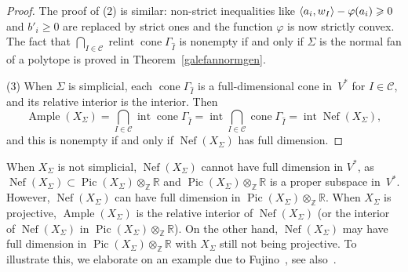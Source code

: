 \documentclass[a4paper]{amsart}
\theoremstyle{definition}
\theoremstyle{remark}
\numberwithin{equation}{section}
\def\R{\mathbb R}
\def\R{\mathbb R}
\def\Z{\mathbb Z}
\newcommand{\mb}[1]{{\textbf {\textit#1}}}
\renewcommand{\ge}{\geqslant}
\def\cone{\mathop{\mathrm{cone}}}
\def\relint{\mathop{\mathrm{relint}}}
\newcommand{\<}{\langle}
\renewcommand{\>}{\rangle}
\begin{document}
\begin{proof}
\smallskip

The proof of (2) is similar: non-strict inequalities like $\langle\mb a_i,\mb w_I\rangle-\varphi(\mb a_i)\ge0$ and $b'_i\ge0$ are replaced by strict ones and the function $\varphi$ is now strictly convex. The fact that $\bigcap_{I\in\mathcal C}
  \relint\cone\Gamma_{\widehat I}$ is nonempty if and only if $\Sigma$ is the normal fan of a polytope is proved in Theorem~\ref{galefannormgen}.
  
\smallskip

(3) When $\Sigma$ is simplicial, each $\cone\Gamma_{\widehat I}$ is a full-dimensional cone in~$V^*$ for $I\in\mathcal C$, and its relative interior is the interior. Then
\[
  \mathop\mathrm{Ample}(X_\Sigma)=\bigcap_{I\in\mathcal C}
  \mathop\mathrm{int}\cone\Gamma_{\widehat I}=\mathop\mathrm{int}  
  \bigcap_{I\in\mathcal C}\cone\Gamma_{\widehat I}=
  \mathop\mathrm{int}\mathop\mathrm{Nef}(X_\Sigma),
\]
and this is nonempty if and only if $\mathop\mathrm{Nef}(X_\Sigma)$ has full dimension.
\end{proof}

When $X_\Sigma$ is not simplicial, $\mathop\mathrm{Nef}(X_\Sigma)$ cannot have full dimension in $V^*$, as $\mathop\mathrm{Nef}(X_\Sigma)\subset\mathop\mathrm{Pic}(X_\Sigma)\otimes_\Z\R$ and $\mathop\mathrm{Pic}(X_\Sigma)\otimes_\Z\R$ is a proper subspace in~$V^*$. However, $\mathop\mathrm{Nef}(X_\Sigma)$ can have full dimension in $\mathop\mathrm{Pic}(X_\Sigma)\otimes_\Z\R$. When $X_\Sigma$ is projective, $\mathop\mathrm{Ample}(X_\Sigma)$ is the relative interior of $\mathop\mathrm{Nef}(X_\Sigma)$ (or the interior of $\mathop\mathrm{Nef}(X_\Sigma)$ in $\mathop\mathrm{Pic}(X_\Sigma)\otimes_\Z\R$). On the other hand, $\mathop\mathrm{Nef}(X_\Sigma)$ may have full dimension in $\mathop\mathrm{Pic}(X_\Sigma)\otimes_\Z\R$ with $X_\Sigma$ still not being projective. To illustrate this, we elaborate on an example due to Fujino~\cite{fuji05}, see also~\cite[Example 6.3.26]{c-l-s11}.
\end{document}
